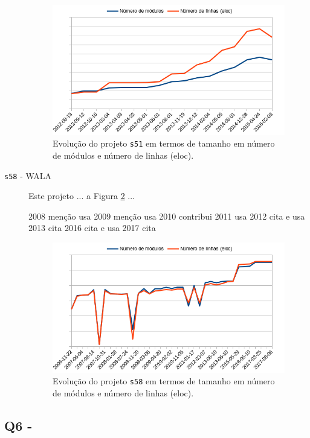 \begin{description}
\begin{figure}[h]
  \centering
  \includegraphics[scale=0.6]{imagens/modules-eloc-s51.png}
  \caption{Evolução do projeto \texttt{s51} em termos de tamanho em número de módulos e número de linhas (eloc).}
  \label{modules-eloc-s51}
\end{figure}

  \item[\texttt{s58} - WALA]
    Este projeto ... a Figura \ref{modules-eloc-s58} ...

2008	menção usa
2009	menção usa
2010	contribui
2011	usa
2012	cita e usa
2013	cita
2016	cita e usa
2017	cita

\begin{figure}[h]
  \centering
  \includegraphics[scale=0.6]{imagens/modules-eloc-s58.png}
  \caption{Evolução do projeto \texttt{s58} em termos de tamanho em número de módulos e número de linhas (eloc).}
  \label{modules-eloc-s58}
\end{figure}

\end{description}

\subsection{Q6 - \QuestaoSeis} %


